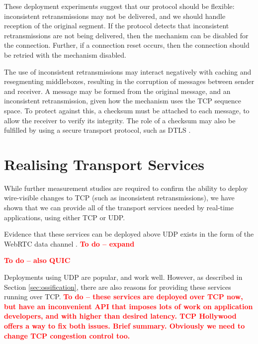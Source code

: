 \documentclass{sig-alternate-05-2015}
\newcommand{\todo}[1]{\textbf{\textcolor{red}{To do -- #1}}}
\begin{document}
These deployment experiments suggest that our protocol should be
flexible: inconsistent retransmissions may not be delivered, and we should
handle reception of the original segment. If the protocol detects that
inconsistent retransmissions are not being delivered, then the mechanism
can be disabled for the connection. Further, if a connection reset occurs,
then the connection should be retried with the mechanism disabled.

The use of inconsistent retransmissions may interact negatively with
caching and resegmenting middleboxes, resulting in the corruption of
messages between sender and receiver. A message may be formed from the
original message, and an inconsistent retransmission, given how the
mechanism uses the TCP sequence space. To protect against this, a checksum
must be attached to each message, to allow the receiver to verify its
integrity. The role of a checksum may also be fulfilled by using a secure
transport protocol, such as DTLS \cite{rfc:6347}.

\section{Realising Transport Services}
\label{sec:realising}

While further measurement studies are required to confirm the ability to
deploy wire-visible changes to TCP (such as inconsistent retransmissions),
we have shown that we can provide all of the transport services needed by
real-time applications, using either TCP or UDP. 

Evidence that these services can be deployed above UDP exists in the form
of the WebRTC data channel \cite{draft-ietf-rtcweb-data-channel-13}.  
\todo{expand}

\todo{also QUIC}


Deployments using UDP are popular, and work well. However, as described in
Section \ref{sec:ossification}, there are also reasons for providing these 
services running over TCP. 
\todo{
  these services are deployed over TCP now, but have an inconvenient API that
  imposes lots of work on application developers, and with higher than desired
  latency. 
  TCP Hollywood offers a way to fix both issues.
  Brief summary.
  Obviously we need to change TCP congestion control too.
}
\end{document}
